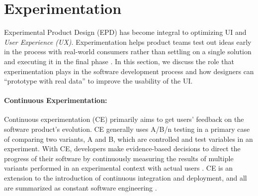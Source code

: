 \section{Experimentation}
\label{background:section:experimentproduct}
Experimental Product Design (EPD) has become integral to optimizing UI and \textit{User Experience (UX)}.
Experimentation helps product teams test out ideas early in the process with real-world consumers rather than settling on a single solution and executing it in the final phase \cite{misc:CE:miklos}.
In this section, we discuss the role that experimentation plays in the software development process and how designers can ``prototype with real data'' to improve the usability of the UI.

\paragraph{Continuous Experimentation:} 
Continuous experimentation (CE) primarily aims to get users' feedback on the software product's evolution.
CE generally uses A/B/n testing in a primary case of comparing two variants, A and B, which are controlled and test variables in an experiment.
With CE, developers make evidence-based decisions to direct the progress of their software by continuously measuring the results of multiple variants performed in an experimental context with actual users \cite{article:CE:ros}.
CE is an extension to the introduction of continuous integration and deployment, and all are summarized as constant software engineering \cite{article:CE:fitzgerald}.






